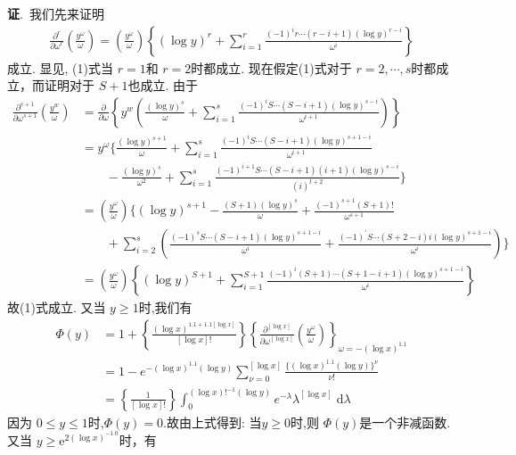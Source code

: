\documentclass{article}
\newcommand{\ee}{\mathrm{e}}
\newcommand{\dd}{\;\mathrm{d}}
\renewcommand{\proof}{\par \textbf{证}.~}
\begin{document}
\proof 我们先来证明 
\begin{align}
    \frac{\partial^r}{\partial\omega^r}\left(\frac{y^\omega}\omega\right)=\left(\frac{y^\omega}\omega\right)\left\{(\log y)^r+\sum_{i=1}^r\frac{(-1)^ir\cdots(r-i+1)(\log y)^{r-i}}{\omega^i}\right\}
\end{align}
成立. 显见, (1)式当 $r=1$和 $r=2$时都成立. 现在假定(1)式对于 $r=2,\cdots,s$时都成立，而证明对于 $S+1$也成立. 由于
\begin{align*}
    \frac{\partial^{s+1}}{\partial\omega^{s+1}}\left(\frac{y^w}\omega\right)
    & = \frac\partial{\partial\omega}\left\{y^w\left(\frac{(\log y)^s}\omega+\sum_{i=1}^s\frac{(-1)^iS\cdots(S-i+1)(\log y)^{s-i}}{\omega^{i+1}}\right)\right\} \\
    & = y^{\omega}\bigg\{
        \frac{(\log y)^{s+1}}{\omega}
        + \sum_{i=1}^{s}\frac{(-1)^{i}S\cdots(S-i+1)(\log y)^{s+1-i}}{\omega^{i+1}} \\
    &\qquad -\frac{(\log y)^{s}}{\omega^{2}}
        + \sum_{i=1}^s\frac{(-1)^{i+1}S\cdots(S-i+1)(i+1)(\log y)^{s-i}}{(i)^{t+2}} 
        \bigg\} \\
    & = \left(\frac{y^\omega}\omega\right)
        \bigg\{
        (\log y)^{s+1} - \frac{(S+1)(\log y)^s}\omega+\frac{(-1)^{s+1}(S+1)!}{\omega^{s+1}} \\
    &\qquad + \sum_{i=2}^s \left(\frac{(-1)^sS\cdots(S-i+1)(\log y)^{s+1-i}}{\omega^i} + \frac{(-1)^{\prime}S\cdots(S+2-i)i(\log y)^{s+1-i}}{\omega^i}\right)
        \bigg\} \\
    & = \left(\frac{y^\omega}\omega\right)\left\{(\log y)^{S+1} + \sum_{i=1}^{S+1}\frac{(-1)^i(S+1)\cdots(S+1-i+1)(\log y)^{s+1-i}}{\omega^i} \right\}
\end{align*}
故(1)式成立. 又当 $y\ge 1$时,我们有
\begin{align*}
    \Phi(y)
    & = 1+\left\{\frac{(\log x)^{1.1+1.1[\log x]}}{[\log x]!}\right\}\left\{\frac{\partial^{[\log x]}}{\partial\omega^{[\log x]}}\left(\frac{y^{\omega}}{\omega}\right)\right\}_{\omega=-(\log x)^{1.1}}  \\
    & = 1-e^{-(\log x)^{1.1}(\log y)}\sum_{\nu=0}^{[\log x]}\frac{\{(\log x)^{1.1}(\log y)\}^{\nu}}{\nu!} \\
    & = \left\{\frac{1}{\left[\log x\right]!}\right\}\int_{0}^{(\log x)!^{-1}(\log y)}e^{-\lambda}\lambda^{[\log x]}\dd\lambda
\end{align*}
因为 $0\le y\le 1$时,$\Phi(y)=0$.故由上式得到: 当$y\ge 0$时,则 $\Phi(y)$是一个非减函数. 又当 $y\ge \ee^{2(\log x)^{-1.0}}$时，有
\end{document}
